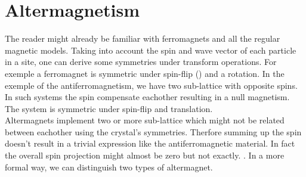 \documentclass[../main.tex]{main.tex}
\begin{document}
\section{Altermagnetism}
The reader might already be familiar with ferromagnets and all the regular magnetic models. Taking into account the spin and
wave vector of each particle in a site, one can derive some symmetries under transform operations. For exemple a
ferromagnet is symmetric under spin-flip () and a rotation. In the exemple of the antiferromagnetism,
we have two sub-lattice with opposite spins. In such systems the spin compensate eachother resulting in a null magnetism.
The system is symmetric under spin-flip and translation.\\

Altermagnets implement two or more sub-lattice which might not be related between eachother using the crystal's symmetries.
Therfore summing up the spin doesn't result in a trivial expression like the antiferromagnetic material. In fact the overall
spin projection might almost be zero but not exactly. . In a more formal way, we can
distinguish two types of altermagnet. \\
\end{document}

